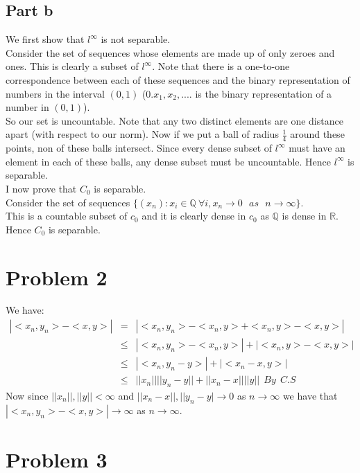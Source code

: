 \documentclass[12pt]{article}
\begin{document}
\subsection*{Part b}
We first show that $l^{\infty}$ is not separable. \\
Consider the set of sequences whose elements are made up of only zeroes and ones.
This is clearly a subset of $l^{\infty}$. Note that there is a one-to-one correspondence between each of these sequences and the binary representation of numbers in the interval $(0,1)$ ($0.x_1,x_2,....$ is the binary representation of a number in $(0,1)$). \\
So our set is uncountable. Note that any two distinct elements are one distance apart (with respect to our norm). Now if we put a ball of radius $\frac{1}{4}$ around these points, non of these balls intersect. Since every dense subset of $l^{\infty}$ must have an element in each of these balls, any dense subset must be uncountable. Hence $l^{\infty}$ is separable. \\
I now prove that $C_0$ is separable. \\
Consider the set of sequences $\{(x_n): x_i \in \mathbb{Q} \ \forall i, x_n \rightarrow 0 \ \ \
as \ \ \ n \rightarrow \infty\}$. \\
This is a countable subset of $c_0$ and it is clearly dense in $c_0$ as $\mathbb{Q}$ is dense in $\mathbb{R}$. \\
Hence $C_0$ is separable.


\clearpage
\section*{Problem 2}
We have:
\begin{eqnarray*}
|<x_n,y_n> - <x,y>| &=& |<x_n,y_n>-<x_n,y>+<x_n,y>-<x,y>|
\\ &\le &
|<x_n,y_n>-<x_n,y>|+|<x_n,y>-<x,y>|
\\ &\le &
|<x_n,y_n-y>|+|<x_n-x,y>|
\\ &\le &
||x_n||||y_n-y||+||x_n-x||||y|| \ \ By  \ \ C.S 
\end{eqnarray*}
Now since $||x_n||,||y|| < \infty $ and $||x_n-x||,||y_n-y| \rightarrow 0$ as $n \rightarrow \infty$ we have that \\
$|<x_n,y_n> - <x,y>| \rightarrow \infty$ as $n \rightarrow \infty$. 


\section*{Problem 3}
\end{document}
